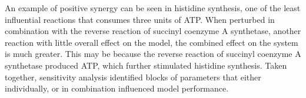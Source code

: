 \documentclass[12pt]{article}
\begin{document}
An example of positive synergy can be seen in histidine synthesis, one of the least influential reactions that consumes three units of ATP.
When perturbed in combination with the reverse reaction of succinyl coenzyme A synthetase, another reaction with little overall effect on the model, the combined effect on the system is much greater.
This may be because the reverse reaction of succinyl coenzyme A synthetase produced ATP, which further stimulated histidine synthesis.
Taken together, sensitivity analysis identified blocks of parameters that either individually, or in combination influenced model performance.
\end{document}
